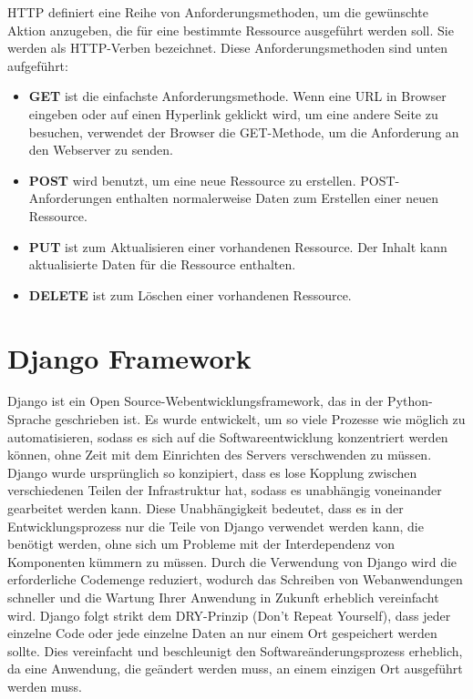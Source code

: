 HTTP definiert eine Reihe von Anforderungsmethoden, um die gewünschte Aktion anzugeben, die für eine bestimmte Ressource ausgeführt werden soll. Sie werden als HTTP-Verben bezeichnet.
Diese Anforderungsmethoden sind unten aufgeführt:
\begin{itemize}
	\item \textbf{GET} ist die einfachste Anforderungsmethode. Wenn eine URL in Browser eingeben oder auf einen Hyperlink geklickt wird, um eine andere Seite zu besuchen, verwendet der Browser die GET-Methode, um die Anforderung an den Webserver zu senden.
	\item \textbf{POST} wird benutzt, um eine neue Ressource zu erstellen. POST-Anforderungen enthalten normalerweise Daten zum Erstellen einer neuen Ressource.
	\item \textbf{PUT} ist zum Aktualisieren einer vorhandenen Ressource. Der Inhalt kann aktualisierte Daten für die Ressource enthalten.
	\item \textbf{DELETE} ist zum Löschen einer vorhandenen Ressource.
\end{itemize}

\section{Django Framework}
\label{sec:theorie:about_django}
Django ist ein Open Source-Webentwicklungsframework, das in der Python-Sprache geschrieben ist. Es wurde entwickelt, um so viele Prozesse wie möglich zu automatisieren, sodass es sich auf die Softwareentwicklung konzentriert werden können, ohne Zeit mit dem Einrichten des Servers verschwenden zu müssen. Django wurde ursprünglich so konzipiert, dass es lose Kopplung zwischen verschiedenen Teilen der Infrastruktur hat, sodass es unabhängig voneinander gearbeitet werden kann. Diese Unabhängigkeit bedeutet, dass es in der Entwicklungsprozess nur die Teile von Django verwendet werden kann, die benötigt werden, ohne sich um Probleme mit der Interdependenz von Komponenten kümmern zu müssen. Durch die Verwendung von Django wird die erforderliche Codemenge reduziert, wodurch das Schreiben von Webanwendungen schneller und die Wartung Ihrer Anwendung in Zukunft erheblich vereinfacht wird. Django folgt strikt dem DRY-Prinzip (Don't Repeat Yourself), dass jeder einzelne Code oder jede einzelne Daten an nur einem Ort gespeichert werden sollte. Dies vereinfacht und beschleunigt den Softwareänderungsprozess erheblich, da eine Anwendung, die geändert werden muss, an einem einzigen Ort ausgeführt werden muss.

